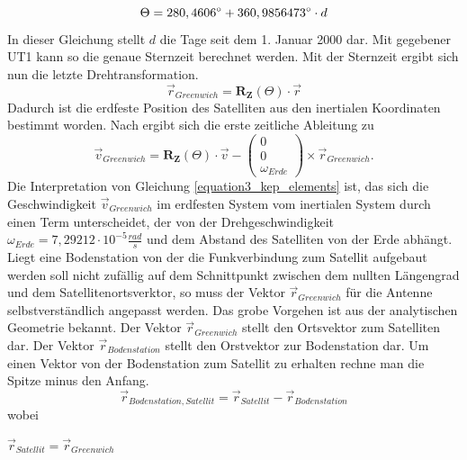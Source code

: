 \begin{equation}
	\Theta = 280,4606\degree+360,9856473\degree\cdot d
\end{equation} 
In dieser Gleichung stellt \ensuremath{d} die Tage seit dem 1. Januar 2000 dar. Mit gegebener UT1 kann so die genaue Sternzeit berechnet werden. Mit der Sternzeit ergibt sich nun die letzte Drehtransformation. 
\begin{equation}
	\vec{r}_{Greenwich}=\mathbf{R_Z}(\Theta) \cdot \vec{r}
\end{equation} 
Dadurch ist die erdfeste Position des Satelliten aus den inertialen Koordinaten bestimmt worden. Nach \cite{HandRaum} ergibt sich die erste zeitliche Ableitung zu
\begin{equation}
	\vec{v}_{Greenwich}=\mathbf{R_Z}(\Theta)\cdot\vec{v}-\left(\begin{array}{c}0\\0\\\omega_{Erde}\end{array}\right)\times\vec{r}_{Greenwich}.
	\label{equation3_kep_elements}
\end{equation}   
Die Interpretation von Gleichung \ref{equation3_kep_elements} ist, das sich die Geschwindigkeit \ensuremath{\vec{v}_{Greenwich}} im erdfesten System vom inertialen System durch einen Term unterscheidet, der von der Drehgeschwindigkeit \ensuremath{\omega_{Erde}=7,29212\cdot 10^{-5}\frac{rad}{s}} und dem Abstand des Satelliten von der Erde abhängt. 
\newpar
Liegt eine Bodenstation von der die Funkverbindung zum Satellit aufgebaut werden soll nicht zufällig auf dem Schnittpunkt zwischen dem nullten Längengrad und dem Satellitenortsverktor, so muss der Vektor \ensuremath{\vec{r}_{Greenwich}} für die Antenne selbstverständlich angepasst werden. Das grobe Vorgehen ist aus der analytischen Geometrie bekannt. Der Vektor \ensuremath{\vec{r}_{Greenwich}} stellt den Ortsvektor zum Satelliten dar. Der Vektor \ensuremath{\vec{r}_{Bodenstation}} stellt den Orstvektor zur Bodenstation dar. Um einen Vektor von der Bodenstation zum Satellit zu erhalten rechne man die Spitze minus den Anfang.
\begin{equation}
	\vec{r}_{Bodenstation,Satellit}=\vec{r}_{Satellit}-\vec{r}_{Bodenstation}
\end{equation} 
wobei 
\begin{center}
	\begin{math}
		\vec{r}_{Satellit}=\vec{r}_{Greenwich}
	\end{math}
\end{center}
